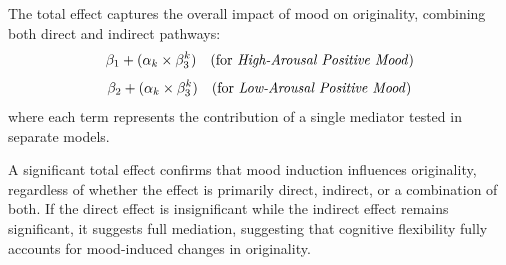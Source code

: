 \documentclass[../MA_Thesis.tex]{subfiles}
\begin{document}
The total effect captures the overall impact of mood on originality, combining both direct and indirect pathways:
\begin{equation*}
    \beta_1 + (\alpha_k \times \beta_3^k) \quad \text{(for \textit{High-Arousal Positive Mood})}
\end{equation*}
\begin{equation*}
    \beta_2 + (\alpha_k \times \beta_3^k) \quad \text{(for \textit{Low-Arousal Positive Mood})}
\end{equation*}
where each term represents the contribution of a single mediator tested in separate models.

A significant total effect confirms that mood induction influences originality, regardless of whether the effect is primarily direct, indirect, or a combination of both. If the direct effect is insignificant while the indirect effect remains significant, it suggests full mediation, suggesting that cognitive flexibility fully accounts for mood-induced changes in originality.
\end{document}

